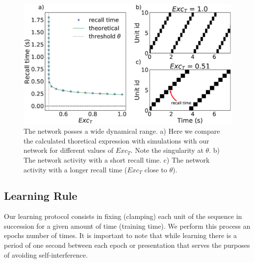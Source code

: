\documentclass{esannV2}
\begin{document}
\begin{figure}[h!]
\centering
\includegraphics[scale=0.28]{dynamical_range.eps}
\caption{The network posses a wide dynamical range. a) Here we compare the calculated thoretical expression with simulations with our network for different values of $Exc_T$. Note the singularity at $\theta$. b) The network activity with a short recall time. c) The network activity with a longer recall time ($Exc_T$ close to $\theta$).}\label{Fig:dynamical_range}
\end{figure}



\subsection{Learning Rule}
Our learning protocol consists in fixing (clamping) each unit of the sequence in succession for a given amount of time (training time). We perform this process an epochs number of times. It is important to note that while learning there is a period of one second between each epoch or presentation that serves the purposes of avoiding self-interference.  
\end{document}
